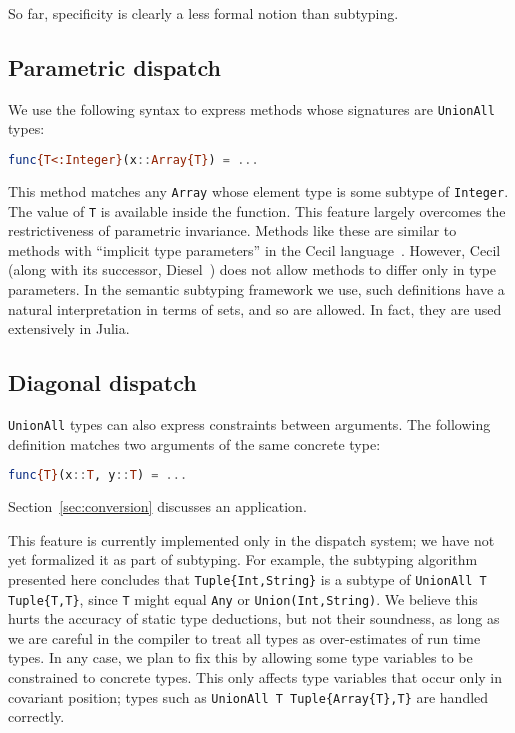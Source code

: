 So far, specificity is clearly a less formal notion than subtyping.

\subsection{Parametric dispatch}

We use the following syntax to express methods whose signatures
are \texttt{UnionAll} types:

\begin{singlespace}
\begin{lstlisting}[language=julia]
func{T<:Integer}(x::Array{T}) = ...
\end{lstlisting}
\end{singlespace}

\noindent
This method matches any \texttt{Array} whose element type is some subtype
of \texttt{Integer}.
The value of \texttt{T} is available inside the function.
This feature largely overcomes the restrictiveness of parametric invariance.
Methods like these are similar to methods with ``implicit type parameters''
in the Cecil language~\cite{cecilspec}.
However, Cecil (along with its successor, Diesel~\cite{chambers2006diesel})
does not allow methods to differ only in type parameters.
In the semantic subtyping framework we use, such definitions have a
natural interpretation in terms of sets, and so are allowed.
In fact, they are used extensively in Julia.

\subsection{Diagonal dispatch}
\label{sec:diagonal}

\texttt{UnionAll} types can also express constraints between arguments.
The following definition matches two arguments of the same concrete
type:

\begin{singlespace}
\begin{lstlisting}[language=julia]
func{T}(x::T, y::T) = ...
\end{lstlisting}
\end{singlespace}

\noindent
Section~\ref{sec:conversion} discusses an application.

This feature is currently implemented only in the dispatch system;
we have not yet formalized it as part of subtyping.
For example, the subtyping algorithm presented here concludes that
\texttt{Tuple\{Int,String\}} is a subtype of
\texttt{UnionAll T Tuple\{T,T\}}, since \texttt{T} might equal
\texttt{Any} or \texttt{Union(Int,String)}.
We believe this hurts the accuracy of static type deductions, but
not their soundness, as long as we are careful in the compiler to
treat all types as over-estimates of run time types.
In any case, we plan to fix this by allowing some type variables
to be constrained to concrete types.
This only affects type variables that occur only in covariant
position; types such as \texttt{UnionAll T Tuple\{Array\{T\},T\}}
are handled correctly.

